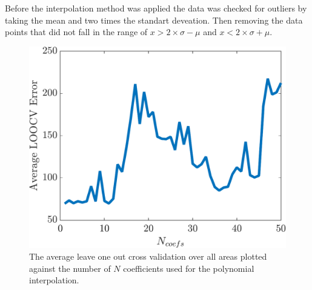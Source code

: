 Before the interpolation method was applied the data was checked for outliers by taking the mean and two times the standart deveation. Then removing the data points that did not fall in the range of $x > 2 \times \sigma - \mu$ and $x < 2 \times \sigma + \mu$.

\begin{figure}[!htb]
\centering
\includegraphics[width=.75\textwidth]{./gfx/chapters/data/Average-LOOCV-Error.pdf}
\caption{The average leave one out cross validation over all areas plotted against the number of $N$ coefficients used for the polynomial interpolation.}
\label{fig:dataset:cumulatief-recordings}
\end{figure}


